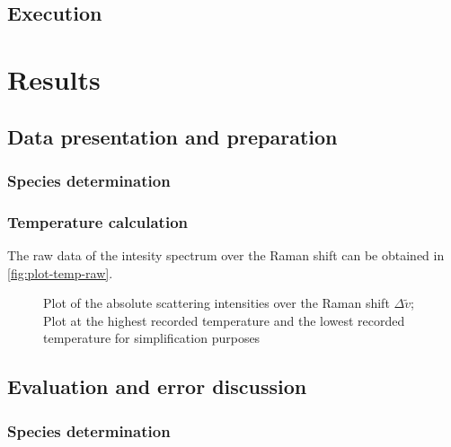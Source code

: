 \section{Execution}

\chapter{Results}
\label{chap:results}

\section{Data presentation and preparation}

\subsection*{Species determination}
\label{subsec:spec-prep}

\subsection*{Temperature calculation}
\label{subsec:temp-prep}

The raw data of the intesity spectrum over the Raman shift can be obtained in \autoref{fig:plot-temp-raw}. 

\begin{figure}[!htb]
    \centering
    
    \caption[Absolute Raman shift intensities for the lowest and highest temperatures]{Plot of the absolute scattering intensities over the Raman shift $\Delta \tilde{v}$; Plot at the highest recorded temperature and the lowest recorded temperature for simplification purposes}
    \label{fig:plot-temp-raw}
\end{figure}

\section{Evaluation and error discussion}
\label{sec:eval}

\subsection*{Species determination}
\label{subsec:spec-eval}


